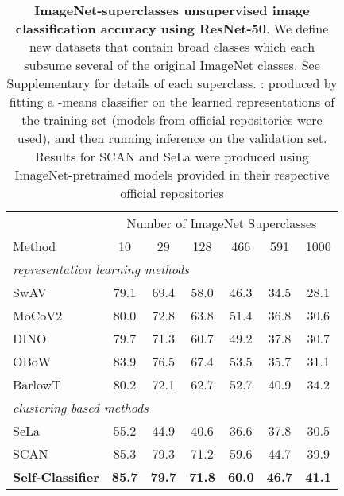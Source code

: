 \documentclass[runningheads]{llncs}
\begin{document}
\begin{table}[bt]
  \centering
  \setlength\tabcolsep{4pt}
    \caption{\textbf{ImageNet-superclasses unsupervised image classification accuracy using ResNet-50}. We define new datasets that contain broad classes which each subsume several of the original ImageNet classes. See Supplementary for details of each superclass. : produced by fitting a -means classifier on the learned representations of the training set (models from official repositories were used), and then running inference on the validation set. Results for SCAN and SeLa were produced using ImageNet-pretrained models provided in their respective official repositories}
  \label{table:unsupervised_image_classification_superclasses}
  \begin{tabular}{lcccccc}
    \toprule
     & \multicolumn{6}{c}{Number of ImageNet Superclasses} \\
    Method & 10 & 29 & 128 & 466 & 591 & 1000 \\
    \midrule
    \multicolumn{7}{l}{\textit{representation learning methods}}\\
    SwAV \cite{caron2020unsupervised} & 79.1 & 69.4 & 58.0 & 46.3 & 34.5 & 28.1 \\
    MoCoV2 \cite{chen2020improved} & 80.0 & 72.8 & 63.8 & 51.4 & 36.8 & 30.6 \\
    DINO \cite{caron2021emerging} & 79.7 & 71.3 & 60.7 & 49.2 & 37.8 & 30.7 \\
    OBoW \cite{gidaris2021obow} & 83.9 & 76.5 & 67.4 & 53.5 & 35.7 & 31.1 \\
    BarlowT \cite{DBLP:conf/icml/ZbontarJMLD21} & 80.2 & 72.1 & 62.7 & 52.7 & 40.9 & 34.2 \\
    \midrule
    \midrule
    \multicolumn{7}{l}{\textit{clustering based methods}}\\
    SeLa \cite{YM.2020Self-labelling} & 55.2 & 44.9 & 40.6 & 36.6 & 37.8 & 30.5 \\
    SCAN \cite{van2020scan} & 85.3 & 79.3 & 71.2 & 59.6 & 44.7 & 39.9 \\
    \midrule
    \textbf{Self-Classifier} & \textbf{85.7} & \textbf{79.7} & \textbf{71.8} & \textbf{60.0} & \textbf{46.7} & \textbf{41.1} \\
    \bottomrule
  \end{tabular}
\end{table}
\end{document}
